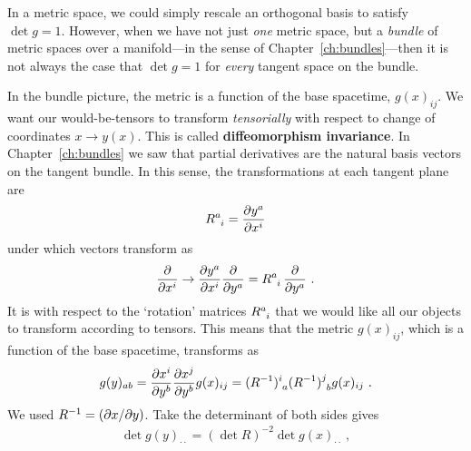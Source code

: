 \documentclass[12pt, oneside]{report}    %
\begin{document}
\begin{subappendices}
 
In a metric space, we could simply rescale an orthogonal basis to satisfy $\det g =1$. However, when we have not just \emph{one} metric space, but a \emph{bundle} of metric spaces over a manifold---in the sense of Chapter~\ref{ch:bundles}---then it is not always the case that $\det g =1$ for \emph{every} tangent space on the bundle.
% 

In the bundle picture, the metric is a function of the base spacetime, $g(x)_{ij}$. 
% 
% 
We want our would-be-tensors to transform \emph{tensorially} with respect to change of coordinates $x \to  y(x)$. This is called \textbf{diffeomorphism invariance}.  In Chapter~\ref{ch:bundles} we saw that partial derivatives are the natural basis vectors on the tangent bundle. In this sense, the transformations at each tangent plane are
\begin{align}
    R\aij{a}{i} = \frac{\partial y^a}{\partial x^i}
\end{align}
under which vectors transform as
\begin{align}
    \frac{\partial}{\partial x^i} \to 
    \frac{\partial y^a}{\partial x^i} \frac{\partial}{\partial y^a}
    = R\aij{a}{i} \, \frac{\partial}{\partial y^a} \ .
\end{align}
It is with respect to the `rotation' matrices $R\aij{a}{i}$ that we would like all our objects to transform according to tensors. 
% 
This means that the metric $g(x)_{ij}$, which is a function of the base spacetime, transforms as
\begin{align}
    g(y)_{ab} = \frac{\partial x^i}{\partial y^b}  \frac{\partial x^j}{\partial y^b} g(x)_{ij}
    = (R\inv)\aij{i}{a} (R\inv)\aij{j}{b} g(x)_{ij} \ .
\end{align}
We used $R^{-1} = (\partial x/\partial y)$. Take the determinant of both sides gives
\begin{align}
    \det g(y)_{\cdot\cdot} = (\det R)^{-2} \det g(x)_{\cdot\cdot} \ ,
    \label{eq:transformation:of:det:g}
\end{align}

\end{subappendices}
\end{document}
